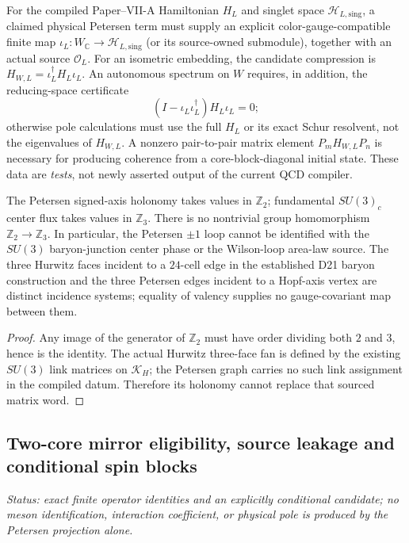 \documentclass[12pt,a4paper]{article}
\begin{document}
\begin{definition}
\label{p10:def:v323-action-incidence-test}
For the compiled Paper--VII-A Hamiltonian $H_L$ and singlet space
$\mathcal H_{L,\mathrm{sing}}$, a claimed physical Petersen term must
supply an explicit color-gauge-compatible finite map
$\iota_L:W_{\mathbb C}\rightarrow\mathcal H_{L,\mathrm{sing}}$ (or its
source-owned submodule), together with an actual source $\mathcal O_L$.
For an isometric embedding, the candidate compression is
$H_{W,L}=\iota_L^{\dagger}H_L\iota_L$.  An autonomous spectrum on $W$
requires, in addition, the reducing-space certificate
\[
 (I-\iota_L\iota_L^\dagger)H_L\iota_L=0;
\]
otherwise pole calculations must use the full $H_L$ or its exact Schur
resolvent, not the eigenvalues of $H_{W,L}$.  A nonzero pair-to-pair
matrix element $P_mH_{W,L}P_n$ is necessary for producing coherence
from a core-block-diagonal initial state.  These data are \emph{tests},
not newly asserted output of the current QCD compiler.
\end{definition}

\begin{proposition}
\label{p10:prop:v323-center-firewall}
The Petersen signed-axis holonomy takes values in $\mathbb Z_2$;
fundamental $SU(3)_c$ center flux takes values in $\mathbb Z_3$.
There is no nontrivial group homomorphism
$\mathbb Z_2\rightarrow\mathbb Z_3$.
In particular, the Petersen $\pm1$ loop cannot be identified with the
$SU(3)$ baryon-junction center phase or the Wilson-loop area-law source.
The three Hurwitz faces incident to a $24$-cell edge in the established
D21 baryon construction and the three Petersen edges incident to a
Hopf-axis vertex are distinct incidence systems; equality of valency
supplies no gauge-covariant map between them.
\end{proposition}
\begin{proof}
Any image of the generator of $\mathbb Z_2$ must have order dividing
both $2$ and $3$, hence is the identity.  The actual Hurwitz three-face
fan is defined by the existing $SU(3)$ link matrices on $\mathcal K_H$;
the Petersen graph carries no such link assignment in the compiled
datum.  Therefore its holonomy cannot replace that sourced matrix word.
\end{proof}

\subsection{Two-core mirror eligibility, source leakage and conditional spin blocks}
\label{p10:sec:v327-mirror-spin-interface}
\noindent\textit{Status: exact finite operator identities and an explicitly
conditional candidate; no meson identification, interaction coefficient,
or physical pole is produced by the Petersen projection alone.}
\end{document}
